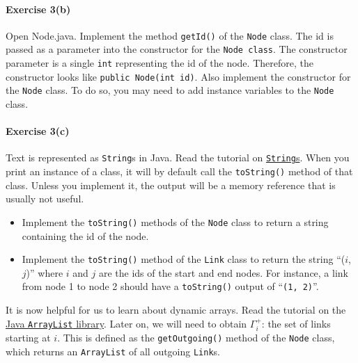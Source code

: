 \documentclass[11pt]{article}
\begin{document}
\paragraph*{Exercise 3(b)} Open Node.java. Implement the method \texttt{getId()} of the \texttt{Node} class. 
The id is passed as a parameter into the constructor for the \texttt{Node class}. The constructor parameter is a single \texttt{int} representing the id of the node. Therefore, the constructor looks like \texttt{public Node(int id)}. 
Also implement the constructor for the \texttt{Node} class. To do so, you may need to add instance variables to the \texttt{Node} class.


\paragraph*{Exercise 3(c)}
Text is represented as \texttt{String}s in Java. Read the tutorial on \href{https://www.w3schools.com/java/java_strings.asp}{\texttt{String}s}. 
When you print an instance of a class, it will by default call the \texttt{toString()} method of that class. Unless you implement it, the output will be a memory reference that is usually not useful.
\begin{itemize}
	\item  Implement the \texttt{toString()} methods of the \texttt{Node} class to return a string containing the id of the node.
	\item Implement the \texttt{toString()} method of the \texttt{Link} class to return the string ``($i$, $j$)'' where $i$ and $j$ are the ids of the start and end nodes. For instance, a link from node 1 to node 2 should have a \texttt{toString()} output of ``\texttt{(1, 2)}''. 
\end{itemize} 
% 

 \vspace{\baselineskip}

\noindent
It is now helpful for us to learn about dynamic arrays. Read the tutorial on the \href{https://www.w3schools.com/java/java_arraylist.asp}{Java \texttt{ArrayList} library}. Later on, we will need to obtain $\Gamma^+_i$: the set of links starting at $i$. This is defined as the \texttt{getOutgoing()} method of the \texttt{Node} class, which returns an \texttt{ArrayList} of all outgoing \texttt{Link}s.
\end{document}
